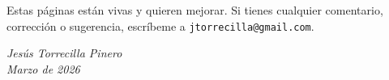 Estas páginas están vivas y quieren mejorar. Si tienes cualquier comentario, corrección o sugerencia, escríbeme a \texttt{jtorrecilla@gmail.com}.

\vspace{2em}

\begin{flushright}
\textit{Jesús Torrecilla Pinero}\\
\textit{Marzo de 2026}
\end{flushright}
